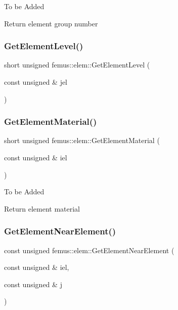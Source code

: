 To be Added

Return element group number \mbox{\label{classfemus_1_1elem_a83d79b7caa55d985d8db0036fc039fbd}} 
\subsubsection{\texorpdfstring{Get\+Element\+Level()}{GetElementLevel()}}
{\footnotesize\ttfamily short unsigned femus\+::elem\+::\+Get\+Element\+Level (\begin{DoxyParamCaption}\item[{const unsigned \&}]{jel }\end{DoxyParamCaption})\hspace{0.3cm}{\ttfamily [inline]}}

\mbox{\label{classfemus_1_1elem_a4f03cbc37f596624428ff2e6b4609094}} 
\subsubsection{\texorpdfstring{Get\+Element\+Material()}{GetElementMaterial()}}
{\footnotesize\ttfamily short unsigned femus\+::elem\+::\+Get\+Element\+Material (\begin{DoxyParamCaption}\item[{const unsigned \&}]{iel }\end{DoxyParamCaption})}

To be Added

Return element material \mbox{\label{classfemus_1_1elem_a55048d0e88b762bc501cce838c297338}} 
\subsubsection{\texorpdfstring{Get\+Element\+Near\+Element()}{GetElementNearElement()}}
{\footnotesize\ttfamily const unsigned femus\+::elem\+::\+Get\+Element\+Near\+Element (\begin{DoxyParamCaption}\item[{const unsigned \&}]{iel,  }\item[{const unsigned \&}]{j }\end{DoxyParamCaption})\hspace{0.3cm}{\ttfamily [inline]}}

